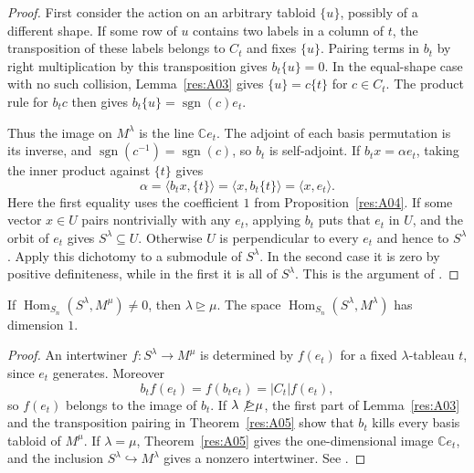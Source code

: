 \begin{proof}
First consider the action on an arbitrary tabloid \(\{u\}\), possibly
of a different shape. If some row of \(u\) contains two labels in a
column of \(t\), the transposition of these labels belongs to \(C_t\)
and fixes \(\{u\}\). Pairing terms in \(b_t\) by right multiplication
by this transposition gives \(b_t\{u\}=0\). In the equal-shape case
with no such collision, Lemma~\ref{res:A03} gives
\(\{u\}=c\{t\}\) for \(c\in C_t\). The product rule for \(b_t c\)
then gives \(b_t\{u\}=\operatorname{sgn}(c)e_t\).

Thus the image on \(M^\lambda\) is the line \(\mathbb C e_t\). The
adjoint of each basis permutation is its inverse, and
\(\operatorname{sgn}(c^{-1})=\operatorname{sgn}(c)\), so \(b_t\)
is self-adjoint. If \(b_t x=\alpha e_t\), taking the inner product
against \(\{t\}\) gives
\[
  \alpha=\langle b_t x,\{t\}\rangle
        =\langle x,b_t\{t\}\rangle=\langle x,e_t\rangle .
\]
Here the first equality uses the coefficient \(1\) from
Proposition~\ref{res:A04}. If some vector \(x\in U\) pairs nontrivially
with any \(e_t\), applying \(b_t\) puts that \(e_t\) in \(U\), and the
orbit of \(e_t\) gives \(S^\lambda\subseteq U\). Otherwise \(U\)
is perpendicular to every \(e_t\) and hence to \(S^\lambda\).
Apply this dichotomy to a submodule of \(S^\lambda\). In the second
case it is zero by positive definiteness, while in the first it is all
of \(S^\lambda\). This is the argument of \cite[\S2.4]{sagan}.
\end{proof}

\begin{proposition}
\label{res:A06}
If \(\operatorname{Hom}_{S_n}(S^\lambda,M^\mu)\neq 0\), then
\(\lambda\unrhd\mu\). The space
\(\operatorname{Hom}_{S_n}(S^\lambda,M^\lambda)\) has dimension \(1\).
\end{proposition}

\begin{proof}
An intertwiner \(f:S^\lambda\to M^\mu\) is determined by \(f(e_t)\)
for a fixed \(\lambda\)-tableau \(t\), since \(e_t\) generates.
Moreover
\[
  b_t f(e_t)=f(b_t e_t)=|C_t| f(e_t),
\]
so \(f(e_t)\) belongs to the image of \(b_t\). If
\(\lambda\not\unrhd\mu\), the first part of Lemma~\ref{res:A03}
and the transposition pairing in Theorem~\ref{res:A05} show
that \(b_t\) kills every basis tabloid of \(M^\mu\).
If \(\lambda=\mu\), Theorem~\ref{res:A05} gives the one-dimensional
image \(\mathbb C e_t\), and the inclusion \(S^\lambda\hookrightarrow
M^\lambda\) gives a nonzero intertwiner. See
\cite[\S2.4, Proposition 2.4.5]{sagan}.
\end{proof}

